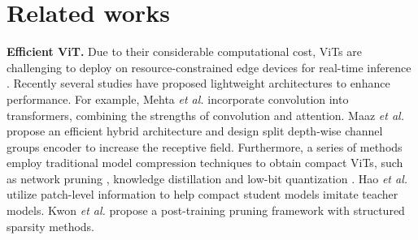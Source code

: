\section{Related works}
\label{sc:related}

\textbf{Efficient ViT. }
Due to their considerable computational cost, ViTs are challenging to deploy on resource-constrained edge devices for real-time inference \cite{DBLP:journals/csur/TayDBM23, shen2023efficient}. 
Recently several studies have proposed lightweight architectures to enhance performance.
For example, Mehta \textit{et al.} \cite{mobilevit} incorporate convolution into transformers, combining the strengths of convolution and attention. 
Maaz \textit{et al.} \cite{DBLP:conf/eccv/MaazSCKZAK22} propose an efficient hybrid architecture and design split depth-wise channel groups encoder to increase the receptive field. 
Furthermore, a series of methods employ traditional model compression techniques to obtain compact ViTs, such as network pruning \cite{DBLP:conf/cvpr/Tang00XGXT22, kwon2022fast, DBLP:conf/nips/ZhenglZYTXRP22}, knowledge distillation \cite{deit, hao2022learning} and low-bit quantization \cite{DBLP:conf/mm/DingQYCLWL22, yuan2022ptq4vit}. 
Hao \textit{et al.} \cite{hao2022learning} utilize patch-level information to help compact student models imitate teacher models. 
Kwon \textit{et al.} \cite{kwon2022fast} propose a post-training pruning framework with structured sparsity methods. 

